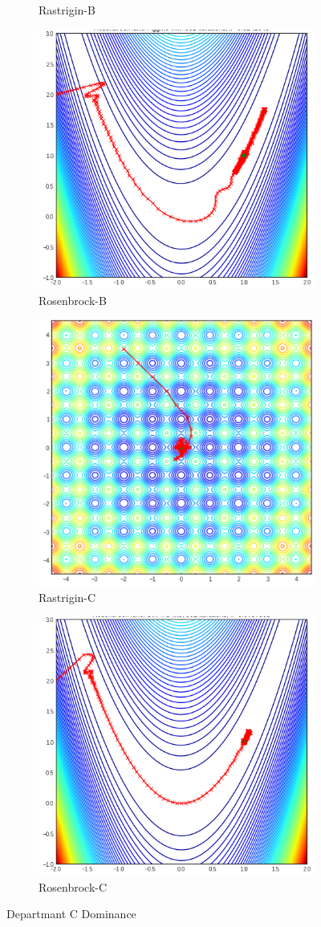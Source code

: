\documentclass[conference]{IEEEtran}
\begin{document}
\begin{figure}[!t]
\begin{subfigure}{.275\textwidth}
  \caption{Rastrigin-B}
  \label{fig:figur:15}
\end{subfigure}%
\begin{subfigure}{.275\textwidth}
  \centering
  \includegraphics[width=.6\linewidth]{rosenbrockb.png}
  \caption{Rosenbrock-B}
  \label{fig:figur:16}
\end{subfigure}
\begin{subfigure}{.275\textwidth}
  \centering
  \includegraphics[width=.6\linewidth]{rastriginc.png}
  \caption{Rastrigin-C}
  \label{fig:figur:17}
\end{subfigure}%
\begin{subfigure}{.275\textwidth}
  \centering
  \includegraphics[width=.6\linewidth]{rosenbrockc.png}
  \caption{Rosenbrock-C}
  \label{fig:figur:18}
\end{subfigure}
\caption{Departmant C Dominance}
\label{fig:sfig6}
\end{figure}
\end{document}
